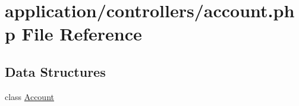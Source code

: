 \hypertarget{account_8php}{\section{application/controllers/account.php File Reference}
\label{account_8php}
}
\subsection*{Data Structures}
\begin{DoxyCompactItemize}
\item 
class \hyperlink{class_account}{Account}
\end{DoxyCompactItemize}
